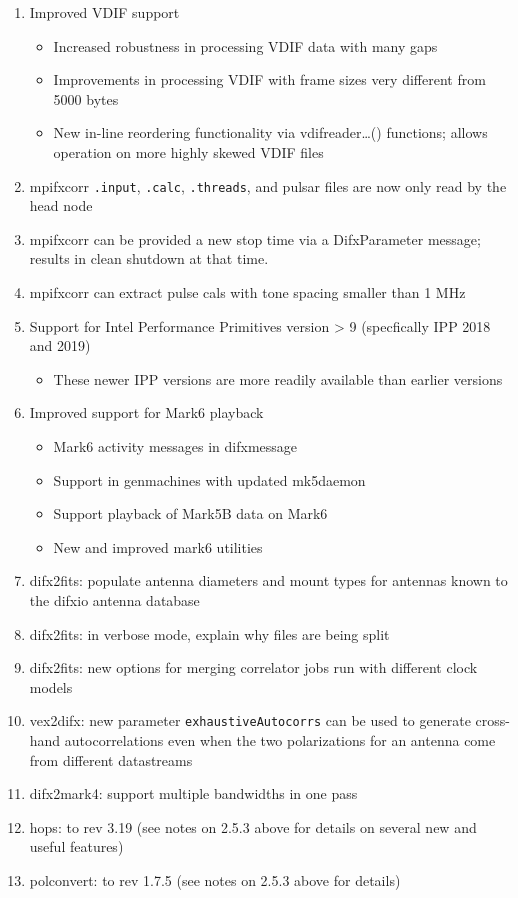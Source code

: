 \begin{enumerate}
\item Improved VDIF support
\begin{itemize}
  \item Increased robustness in processing VDIF data with many gaps
  \item Improvements in processing VDIF with frame sizes very different from 5000 bytes
  \item  New in-line reordering functionality via vdifreader…() functions; allows operation on more highly skewed VDIF files
\end{itemize}
\item mpifxcorr {\tt .input}, {\tt .calc}, {\tt .threads}, and pulsar files are now only read by the head node
\item mpifxcorr can be provided a new stop time via a DifxParameter message; results in clean shutdown at that time.
\item mpifxcorr can extract pulse cals with tone spacing smaller than 1 MHz
\item Support for Intel Performance Primitives version > 9 (specfically IPP 2018 and 2019)
\begin{itemize}
  \item These newer IPP versions are more readily available than earlier versions
\end{itemize}
\item Improved support for Mark6 playback
\begin{itemize}
  \item Mark6 activity messages in difxmessage
  \item Support in genmachines with updated mk5daemon
  \item Support playback of Mark5B data on Mark6
  \item New and improved mark6 utilities
\end{itemize}
\item difx2fits: populate antenna diameters and mount types for antennas known to the difxio antenna database
\item difx2fits: in verbose mode, explain why files are being split
\item difx2fits: new options for merging correlator jobs run with different clock models
\item vex2difx: new parameter {\tt exhaustiveAutocorrs} can be used to generate cross-hand autocorrelations even when the two polarizations for an antenna come from different datastreams
\item difx2mark4: support multiple bandwidths in one pass
\item hops: to rev 3.19 (see notes on 2.5.3 above for details on several new and useful features)
\item polconvert: to rev 1.7.5 (see notes on 2.5.3 above for details)
\end{enumerate}

